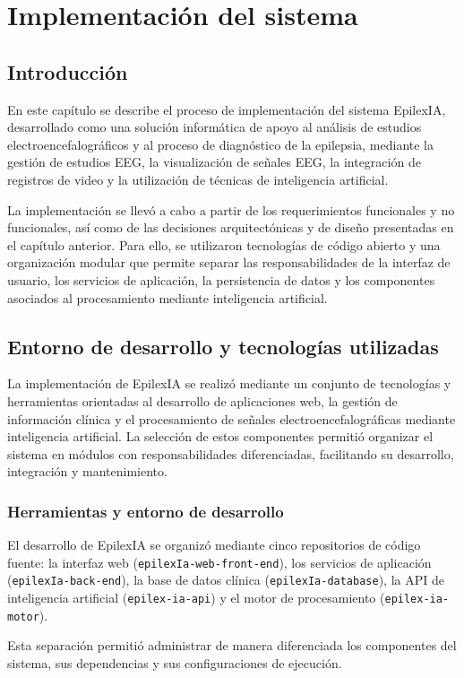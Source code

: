\chapter{Implementación del sistema}
\label{cap:implementacion-sistema}

\section{Introducción}
\label{introduccion}

En este capítulo se describe el proceso de implementación del sistema
EpilexIA, desarrollado como una solución informática de apoyo al
análisis de estudios electroencefalográficos y al proceso de diagnóstico
de la epilepsia, mediante la gestión de estudios EEG,
la visualización de señales EEG, la integración de registros de video
y la utilización de técnicas de inteligencia artificial.

La implementación se llevó a cabo a partir de los requerimientos
funcionales y no funcionales, así como de las decisiones arquitectónicas
y de diseño presentadas en el capítulo anterior. Para ello, se utilizaron
tecnologías de código abierto y una organización modular que permite
separar las responsabilidades de la interfaz de usuario, los servicios
de aplicación, la persistencia de datos y los componentes asociados
al procesamiento mediante inteligencia artificial.

\section{Entorno de desarrollo y tecnologías utilizadas}
\label{entorno-desarrollo-tecnologias-utilizadas}

La implementación de EpilexIA se realizó mediante un conjunto de tecnologías y herramientas orientadas al desarrollo de aplicaciones web, la gestión de información clínica y el procesamiento de señales electroencefalográficas mediante inteligencia artificial. La selección de estos componentes permitió organizar el sistema en módulos con responsabilidades diferenciadas, facilitando su desarrollo, integración y mantenimiento.

\subsection{Herramientas y entorno de desarrollo}
\label{herramientas-entorno-desarrollo}

\begin{sloppypar}
\begin{nuevotextodos}
El desarrollo de EpilexIA se organizó mediante cinco repositorios de código fuente: la interfaz web (\texttt{epilexIa-web-front-end}), los servicios de aplicación (\texttt{epilexIa-back-end}), la base de datos clínica (\texttt{epilexIa-database}), la API de inteligencia artificial (\texttt{epilex-ia-api}) y el motor de procesamiento (\texttt{epilex-ia-motor}).
\end{nuevotextodos}
Esta separación permitió administrar de manera diferenciada los componentes del sistema, sus dependencias y sus configuraciones de ejecución.
\end{sloppypar}

